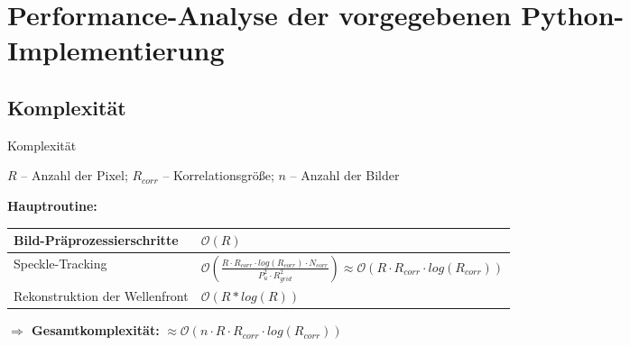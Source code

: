 
\section{Performance-Analyse der vorgegebenen Python-Implementierung}

\subsection{Komplexität}
\begin{frame}{Komplexität}
	\begin{center}
		$ R $ -- Anzahl der Pixel; $ R_{corr} $ -- Korrelationsgröße; $ n $ -- Anzahl der Bilder \\
	\end{center}
	\textbf{Hauptroutine:} \\
	\setlength\extrarowheight{5pt}
	\begin{center}
		\begin{tabular}{| >{\centering\arraybackslash}m{4cm} | >{\centering\arraybackslash}m{5cm} |}
			\hline
			Bild-Präprozessierschritte & $ \mathcal{O}(R) $ \\ \hline
			Speckle-Tracking & $\mathcal{O}\left(\frac{R \cdot R_{corr} \cdot log\left(R_{corr}\right) \cdot N_{corr}}{P_u^2 \cdot R_{grid}^2}\right) \approx \mathcal{O}\left(R \cdot R_{corr} \cdot log\left(R_{corr}\right)\right)$ \\ \hline
			Rekonstruktion der Wellenfront & $ \mathcal{O}(R * log(R)) $ \\ \hline
		\end{tabular}
	\end{center}
	\vspace{.5cm}
	\textbf{$ \Rightarrow $ Gesamtkomplexität:} $ \approx \mathcal{O}\left(n \cdot R \cdot R_{corr} \cdot log\left(R_{corr}\right)\right)$
\end{frame}

